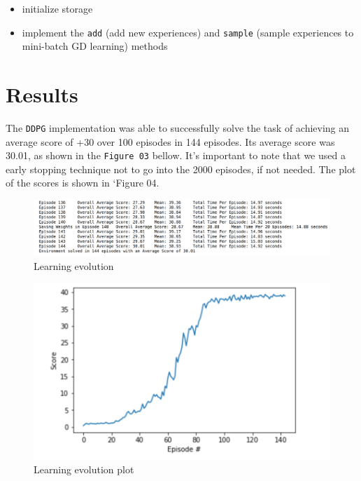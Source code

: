 \documentclass[
]{article}
\providecommand{\tightlist}{%
  \setlength{\itemsep}{0pt}\setlength{\parskip}{0pt}}
\begin{document}
\begin{itemize}
  \begin{itemize}
  \tightlist
  \item
    initialize storage
  \item
    implement the \texttt{add} (add new experiences) and \texttt{sample}
    (sample experiences to mini-batch GD learning) methods
  \end{itemize}
\end{itemize}

\pagebreak

\hypertarget{results}{%
\section{Results}\label{results}}

The \texttt{DDPG} implementation was able to successfully solve the task
of achieving an average score of +30 over 100 episodes in 144 episodes.
Its average score was 30.01, as shown in the \texttt{Figure\ 03} bellow.
It's important to note that we used a early stopping technique not to go
into the 2000 episodes, if not needed. The plot of the scores is shown
in `Figure 04.

\begin{figure}
\centering
\includegraphics{imgs/results_1.png}
\caption{Learning evolution}
\end{figure}

\begin{figure}
\centering
\includegraphics{imgs/results_2.png}
\caption{Learning evolution plot}
\end{figure}
\end{document}
